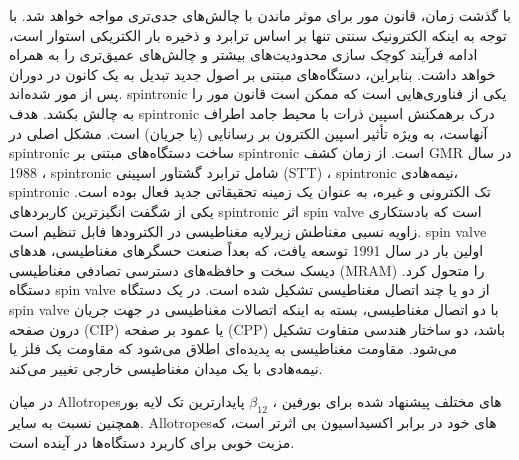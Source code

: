 با گذشت زمان، قانون مور برای موثر ماندن با چالش‌های جدی‌تری مواجه خواهد شد. با توجه به اینکه الکترونیک سنتی تنها بر اساس ‌ترابرد و ذخیره بار الکتریکی استوار است، ادامه فرآیند کوچک سازی محدودیت‌های بیشتر و چالش‌های عمیق‌تری را به همراه خواهد داشت. بنابراین، دستگاه‌های مبتنی بر اصول جدید تبدیل به یک کانون در دوران پس از مور \cite{zhuRecentProgressOrganic2023, zhouValleySplittingAnomalous2020} شده‌اند. \gls{spintronic} یکی از فناوری‌هایی است که ممکن است قانون مور را به چالش بکشد. هدف \gls{spintronic} درک برهمکنش اسپین ذرات با محیط جامد اطراف آنهاست، به ویژه تأثیر اسپین الکترون بر رسانایی (یا جریان) است. مشکل اصلی در \gls{spintronic} ساخت دستگاه‌های مبتنی بر \gls{spintronic} است. از زمان کشف \gls{GMR} در سال 1988 \cite{baibichGiantMagnetoresistance0011988, binaschEnhancedMagnetoresistanceLayered1989}، \gls{spintronic} شامل ترابرد گشتاور اسپینی (\gls{STT}) \cite{zuticSpintronicsFundamentalsApplications2004, fertNobelLectureOrigin2008}، \gls{spintronic} نیمه‌هادی، \gls{spintronic} تک الکترونی و غیره، به عنوان یک ز‌مینه تحقیقاتی جدید فعال بوده است. یکی از شگفت انگیزترین کاربردهای \gls{spintronic} اثر \gls{spin valve} \cite{zuticSpintronicsFundamentalsApplications2004} است که بادستکاری زاویه نسبی مغناطش زیرلایه مغناطیسی در الکترودها فابل تنظیم است. \gls{spin valve} اولین بار در سال 1991 توسعه یافت، که بعداً صنعت حسگرهای مغناطیسی، هدهای دیسک سخت و حافظه‌های دسترسی تصادفی مغناطیسی (\gls{MRAM}) \cite{tsangDesignFabricationTesting1994, lealUnshieldedSpinvalveSensors1994, freitasSpinvalveSensorsExchange1994} را متحول کرد. دستگاه \gls{spin valve} از دو یا چند اتصال مغناطیسی تشکیل شده است. در یک دستگاه \gls{spin valve} با دو اتصال مغناطیسی، بسته به اینکه اتصالات مغناطیسی در جهت جریان درون صفحه (\gls{CIP}) یا عمود بر صفحه (\gls{CPP}) باشد، دو ساختار هندسی متفاوت تشکیل ‌‌می‌‌شود. مقاومت مغناطیسی به پدیده‌ای اطلاق ‌‌می‌‌شود که مقاومت یک فلز یا نیمه‌هادی با یک ‌میدان مغناطیسی خارجی تغییر ‌‌می‌‌کند.

در ‌میان \gls{Allotropes}های مختلف پیشنهاد شده برای ‌بورفین ، $\beta_{12}$  پایدارترین تک لایه بور .همچنین نسبت به سایر \gls{Allotropes}های خود در برابر اکسیداسیون بی اثرتر است، که مزیت خوبی برای کاربرد دستگاه‌ها در آینده است.


